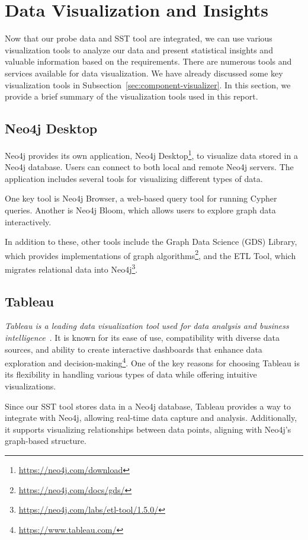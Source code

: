 \section{Data Visualization and Insights}\label{sec:data_visualization}

Now that our probe data and SST tool are integrated, we can use various visualization tools to analyze our data and present statistical insights and valuable information based on the requirements. There are numerous tools and services available for data visualization. We have already discussed some key visualization tools in Subsection~\ref{sec:component-visualizer}. In this section, we provide a brief summary of the visualization tools used in this report.

\subsection{Neo4j Desktop}
Neo4j provides its own application, Neo4j Desktop\footnote{\url{https://neo4j.com/download}}, to visualize data stored in a Neo4j database. Users can connect to both local and remote Neo4j servers. The application includes several tools for visualizing different types of data.

One key tool is Neo4j Browser, a web-based query tool for running Cypher queries. Another is Neo4j Bloom, which allows users to explore graph data interactively.

In addition to these, other tools include the Graph Data Science (GDS) Library, which provides implementations of graph algorithms\footnote{\url{https://neo4j.com/docs/gds/}}, and the ETL Tool, which migrates relational data into Neo4j\footnote{\url{https://neo4j.com/labs/etl-tool/1.5.0/}}.

\subsection{Tableau}
\textit{Tableau is a leading data visualization tool used for data analysis and business intelligence}~\citep{biswal2024visualization}. It is known for its ease of use, compatibility with diverse data sources, and ability to create interactive dashboards that enhance data exploration and decision-making\footnote{\url{https://www.tableau.com/}}. One of the key reasons for choosing Tableau is its flexibility in handling various types of data while offering intuitive visualizations.

Since our SST tool stores data in a Neo4j database, Tableau provides a way to integrate with Neo4j, allowing real-time data capture and analysis. Additionally, it supports visualizing relationships between data points, aligning with Neo4j's graph-based structure.

